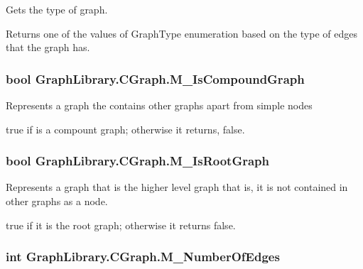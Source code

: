 Gets the type of graph. 

Returns one of the values of Graph\+Type enumeration based on the type of edges that the graph has. \hypertarget{class_graph_library_1_1_c_graph_a6773626813d807a0d4db0ab860baad9e}{}
\subsubsection[{M\+\_\+\+Is\+Compound\+Graph}]{\setlength{\rightskip}{0pt plus 5cm}bool Graph\+Library.\+C\+Graph.\+M\+\_\+\+Is\+Compound\+Graph\hspace{0.3cm}{\ttfamily [get]}}\label{class_graph_library_1_1_c_graph_a6773626813d807a0d4db0ab860baad9e}


Represents a graph the contains other graphs apart from simple nodes 

{\ttfamily true} if is a compount graph; otherwise it returns, {\ttfamily false}. \hypertarget{class_graph_library_1_1_c_graph_a262016f2855aac75e0b5611a26f149a8}{}
\subsubsection[{M\+\_\+\+Is\+Root\+Graph}]{\setlength{\rightskip}{0pt plus 5cm}bool Graph\+Library.\+C\+Graph.\+M\+\_\+\+Is\+Root\+Graph\hspace{0.3cm}{\ttfamily [get]}}\label{class_graph_library_1_1_c_graph_a262016f2855aac75e0b5611a26f149a8}


Represents a graph that is the higher level graph that is, it is not contained in other graphs as a node. 

{\ttfamily true} if it is the root graph; otherwise it returns {\ttfamily false}. \hypertarget{class_graph_library_1_1_c_graph_a984f5731db28443874a6a6ba6a8ad824}{}
\subsubsection[{M\+\_\+\+Number\+Of\+Edges}]{\setlength{\rightskip}{0pt plus 5cm}int Graph\+Library.\+C\+Graph.\+M\+\_\+\+Number\+Of\+Edges\hspace{0.3cm}{\ttfamily [get]}}\label{class_graph_library_1_1_c_graph_a984f5731db28443874a6a6ba6a8ad824}


